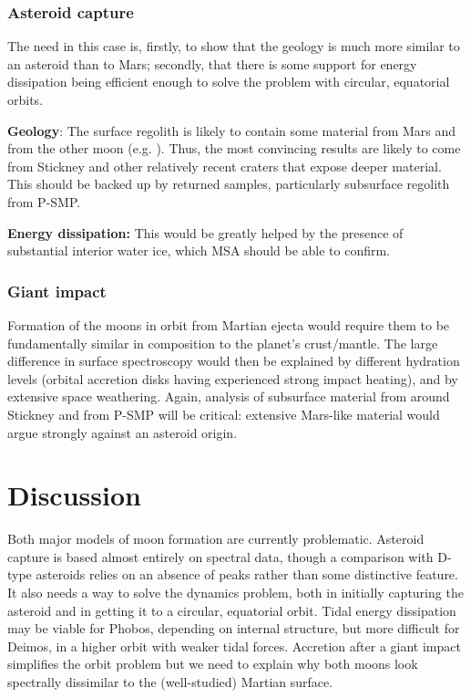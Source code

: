 \subsubsection{Asteroid capture}

The need in this case is, firstly, to show that the geology is much more similar to an asteroid than to Mars; secondly, that there is some support for energy dissipation being efficient enough to solve the problem with circular, equatorial orbits.

\textbf{Geology}: The surface regolith is likely to contain some material from Mars and from the other moon (e.g. \citet{nayak_effects_2016}). Thus, the most convincing results are likely to come from Stickney and other relatively recent craters that expose deeper material. This should be backed up by returned samples, particularly subsurface regolith from P-SMP.

\textbf{Energy dissipation:} This would be greatly helped by the presence of substantial interior water ice, which MSA should be able to confirm.

\subsubsection{Giant impact}

Formation of the moons in orbit from Martian ejecta would require them to be fundamentally similar in composition to the planet's crust/mantle. The large difference in surface spectroscopy would then be explained by different hydration levels (orbital accretion disks having experienced strong impact heating), and by extensive space weathering. Again, analysis of subsurface material from around Stickney and from P-SMP will be critical: extensive Mars-like material would argue strongly against an asteroid origin.

\section{Discussion}\label{section:discussion}

Both major models of moon formation are currently problematic. Asteroid capture is based almost entirely on spectral data, though a comparison with D-type asteroids relies on an absence of peaks rather than some distinctive feature. It also needs a way to solve the dynamics problem, both in initially capturing the asteroid and in getting it to a circular, equatorial orbit. Tidal energy dissipation may be viable for Phobos, depending on internal structure, but more difficult for Deimos, in a higher orbit with weaker tidal forces. Accretion after a giant impact simplifies the orbit problem but we need to explain why both moons look spectrally dissimilar to the (well-studied) Martian surface.

